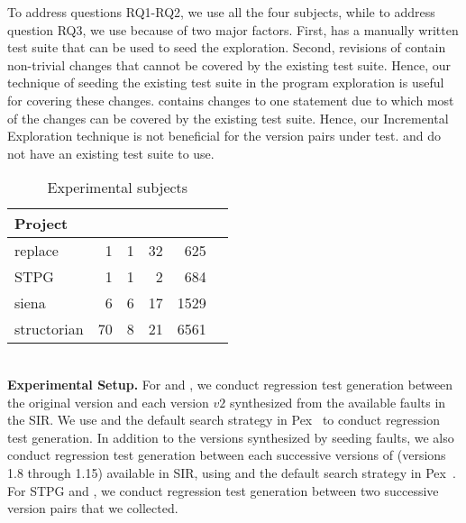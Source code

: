 To address questions RQ1-RQ2, we use all the four subjects, while to address question RQ3, we use  because of two major factors. First,  has a manually written test suite that can be used to seed the exploration. Second, revisions of  contain non-trivial changes that cannot be covered by the existing test suite. Hence, our technique of seeding the existing test suite in the program exploration is useful for covering these changes.  contains changes to one statement due to which most of the changes can be covered by the existing test suite.
Hence, our Incremental Exploration technique is not beneficial for the version pairs under test.
  and  do not have an existing test suite to use.
\setlength{\tabcolsep}{6pt}
\begin{table}
\begin{CodeOut}
\begin{center}
\vspace{- 0.3 in}
\caption {\label{table:subjects}Experimental subjects}
\vspace{- 0.1 in}
\begin {tabular} {|l|r|r|r|r|r|}
\hline
Project&\CenterCell{Classes}&\CenterCell{Classes Covered}&\CenterCell{Versions}&\CenterCell{LOC}\\

\hline
\hline replace &1&1&32&625\\
\hline STPG &1&1&2&684\\
\hline siena &6&6&17&1529\\
\hline structorian &70&8&21&6561\\
\hline
\end{tabular}
\end{center}
\end{CodeOut}
\vspace{- 0.3 in}
\end{table}
\\ \textbf{Experimental Setup.} For  and , we conduct regression test generation between the original version and each version $v2$ synthesized from the available faults in the SIR. We use  and the default search strategy in Pex~\cite{Pex,fitnex} to conduct regression test generation. In addition to the versions synthesized by seeding faults, we also conduct regression test generation between each successive versions of  (versions 1.8 through 1.15) available in SIR, using  and the default search strategy in Pex~\cite{Pex,fitnex}. For STPG and , we conduct regression test generation between two successive version pairs that we collected. 

